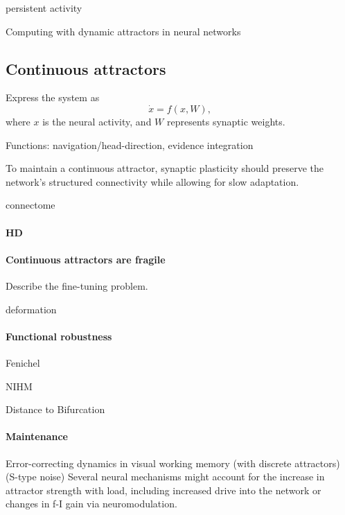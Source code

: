 \documentclass{article}
\theoremstyle{definition} \newtheorem{definition}{Definition}
\theoremstyle{remark} \newtheorem{remark}{Remark}
\newcounter{ct}
\begin{document}
persistent activity \citep{curtis2010beyond}

Computing with dynamic attractors in neural networks \citep{hirsch1995computing}

\subsection{Continuous attractors}
Express the system as 
\begin{equation}
\dot x = f(x,W),
\end{equation} where $x$ is the neural activity, and $W$ represents synaptic weights.

Functions: navigation/head-direction\citep{wilson2023navigation, skaggs1994model}, evidence integration\citep{mante2013context, esnaola2022flexible}

To maintain a continuous attractor, synaptic plasticity should preserve the network’s structured connectivity while allowing for slow adaptation.
\citep{cannon1983oculomotor}
\citep{samsonovich1997pathintegration}

connectome \citep{kakaria2017ra}

\paragraph{HD}
\citep{skaggs1994model, redish1996coupled, boucheny2005continuous}
\citep{stentiford2022spiking}
\citep{barak2021mapping}

\paragraph{Continuous attractors are fragile}
Describe the fine-tuning problem.

deformation \citep{goodridge2000modeling}

\paragraph{Functional robustness}

Fenichel

NIHM

\citep{li2013normally}

Distance to Bifurcation \citep{dobson2003sensitivity}

\paragraph{Maintenance}
Error-correcting dynamics in visual working memory (with discrete attractors) \citep{panichello2019error} (S-type noise)
Several neural mechanisms might account for the increase in attractor strength with load, including increased drive into the network\citep{wang2018flexible} or changes in f-I gain via neuromodulation\citep{servan1990network}.
\end{document}
